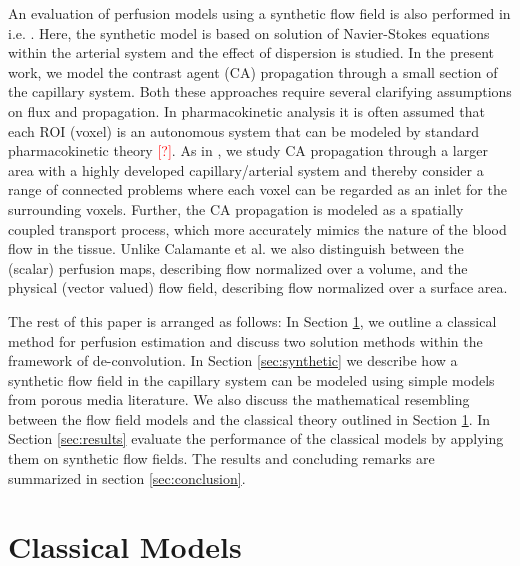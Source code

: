 \documentclass[paper=a4, fontsize=11pt,parskip=half,headings=small]{scrartcl}
\newcommand{\missingsource}{\textcolor{red}{[?]}}
\begin{document}
	An evaluation of perfusion models using a synthetic flow field is also performed in i.e. \cite{calamante03}. 
	Here, the synthetic model is based on solution of Navier-Stokes equations within the arterial system and the effect of dispersion is studied.  
	In the present work, we model the contrast agent (CA) propagation through a small section of the capillary system. 
	Both these approaches require several clarifying assumptions on flux and propagation. 
	In pharmacokinetic analysis it is often assumed that each ROI (voxel) is an autonomous system that can be modeled by standard pharmacokinetic theory \missingsource. 
	As in \cite{calamante03}, we study CA propagation through a larger area with a highly developed capillary/arterial system and thereby consider a range of connected problems where each voxel can be regarded as an inlet for the surrounding voxels.  
	Further, the CA propagation is modeled as a spatially coupled transport process, which more accurately mimics the nature of the blood flow in the tissue.  
	Unlike Calamante et al. we also distinguish between the (scalar) perfusion maps, describing flow normalized over a volume, and the physical (vector valued) flow field, describing flow normalized over a surface area. 


	The rest of this paper is arranged as follows: In Section \ref{sec:classical}, we outline a classical method for perfusion estimation and discuss two solution methods within the framework of de-convolution. 
	In Section \ref{sec:synthetic} we describe how a synthetic flow field in the capillary system can be modeled using simple models from porous media literature. 
	We also discuss the mathematical resembling between the flow field models and the classical theory outlined in Section \ref{sec:classical}. 
	In Section \ref{sec:results} evaluate the performance of the classical models by applying them on synthetic flow fields. 
	The results and concluding remarks are summarized in section \ref{sec:conclusion}.
	
	
	
	
	\section{Classical Models} \label{sec:classical}
\end{document}
